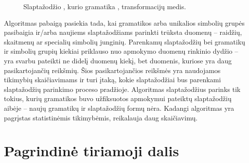 \documentclass{VUMIFInfBakalaurinis}
\begin{document}
\begin{figure}
  \caption{
    Slaptažodžio , kurio gramatika ,
    transformacijų medis.
  }
  \label{plot:pcfgtransforms}
\end{figure}

Algoritmas pabaigą pasiekia tada, kai gramatikos arba unikalios simbolių grupės 
pasibaigia ir/arba naujiems slaptažodžiams parinkti trūksta duomenų -- raidžių, 
skaitmenų ar specialių simbolių junginių. Parenkamų slaptažodžių bei gramatikų 
ir simbolių grupių kiekiai priklauso nuo apmokymo duomenų rinkinio dydžio -- yra 
svarbu pateikti ne didelį duomenų kiekį, bet duomenis, kuriose yra daug 
pasikartojančių reikšmių. Šios pasikartojančios reikšmės yra naudojamos 
tikimybių skaičiavimams ir turi įtaką, kokie slaptažodžiai bus parenkami 
slaptažodžių parinkimo proceso pradžioje.
Algoritmas slaptažodžius parinks tik tokius, kurių gramatikos buvo užfiksuotos 
apmokymui pateiktų slaptažodžių aibėje -- naujų gramatikų ir slaptažodžių formų 
nėra.
Kadangi  algoritmas yra pagrįstas statistinėmis tikimybėmis, 
reikalauja daug skaičiavimų.

\section{Pagrindinė tiriamoji dalis}
\end{document}
